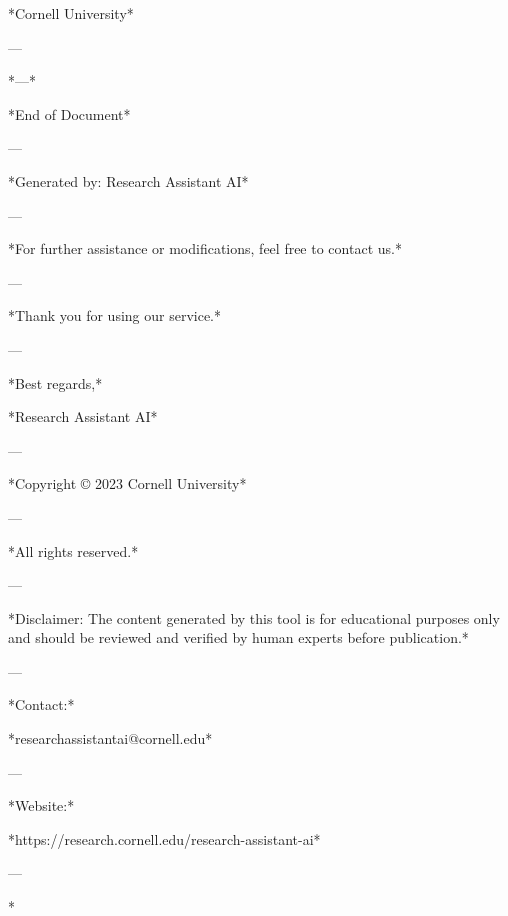 *Cornell University* 

--- 

*---* 

*End of Document* 

--- 

*Generated by: Research Assistant AI* 

--- 

*For further assistance or modifications, feel free to contact us.* 

--- 

*Thank you for using our service.* 

--- 

*Best regards,* 

*Research Assistant AI* 

--- 

*Copyright © 2023 Cornell University* 

--- 

*All rights reserved.* 

--- 

*Disclaimer: The content generated by this tool is for educational purposes only and should be reviewed and verified by human experts before publication.* 

--- 

*Contact:* 

*researchassistantai@cornell.edu* 

--- 

*Website:* 

*https://research.cornell.edu/research-assistant-ai* 

--- 

*